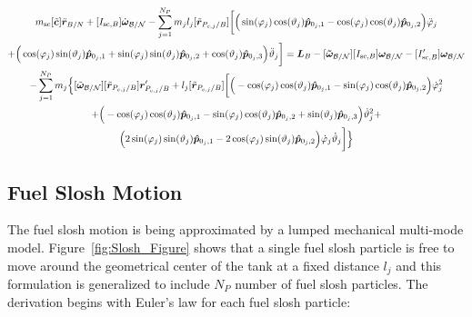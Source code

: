 \documentclass[]{BasiliskReportMemo}
\begin{document}
	\begin{multline}
	m_{\text{sc}}[\tilde{\bm{c}}]\ddot{\bm r}_{B/N}+[I_{\text{sc},B}] \dot{\bm\omega}_{\cal B/N}  - \sum\limits_{j=1}^{N_P}m_j l_j [\tilde{\bm{r}}_{P_{c,j}/B}] \bigg[
	\Big(\sin(\varphi_j)\cos(\vartheta_j)\bm{\hat{p}}_{0_j,1}-\cos(\varphi_j)\cos(\vartheta_j)\bm{\hat{p}}_{0_j,2}\Big)\ddot{\varphi}_j \\
	+\Big(\cos(\varphi_j)\sin(\vartheta_j)\bm{\hat{p}}_{0_j,1}+\sin(\varphi_j)\sin(\vartheta_j)\bm{\hat{p}}_{0_j,2}+\cos(\vartheta_j)\bm{\hat{p}}_{0_j,3} \Big)\ddot{\vartheta}_j
	\bigg] =
	\bm{L}_B-[\bm{\tilde{\omega}}_{\cal B/N}] [I_{\text{sc},B}] \bm\omega_{\cal B/N}
	- [I'_{\text{sc},B}] \bm\omega_{\cal B/N}\\ 	- \sum\limits_{j=1}^{N_P} m_j \Big\{[\tilde{\bm\omega}_{\cal B/N}] [\tilde{\bm{r}}_{P_{c,j}/B}] \bm{r}'_{P_{c,j}/B}+l_j[\tilde{\bm{r}}_{P_{c,j}/B}]\bigg[
	\Big(-\cos(\varphi_j)\cos(\vartheta_j)\bm{\hat{p}}_{0_j,1}-\sin(\varphi_j)\cos(\vartheta_j)\bm{\hat{p}}_{0_j,2}\Big)\dot{\varphi}_j^2 \\
	+\Big(-\cos(\varphi_j)\cos(\vartheta_j)\bm{\hat{p}}_{0_j,1}-\sin(\varphi_j)\cos(\vartheta_j)\bm{\hat{p}}_{0_j,2}+\sin(\vartheta_j)\bm{\hat{p}}_{0_j,3} \Big)\dot{\vartheta}_j^2 +\\
	\Big(2\sin(\varphi_j)\sin(\vartheta_j)\bm{\hat{p}}_{0_j,1} -2\cos(\varphi_j)\sin(\vartheta_j)\bm{\hat{p}}_{0_j,2}\Big)\dot{\varphi}_j\dot{\vartheta}_j
	\bigg]\Big\}
	\label{eq:Final6}
	\end{multline}
	
	\subsection{Fuel Slosh Motion}
	The fuel slosh motion is being approximated by a lumped mechanical multi-mode model. Figure~\ref{fig:Slosh_Figure} shows that a single fuel slosh particle is free to move around the geometrical center of the tank at a fixed distance $l_j$ and this formulation is generalized to include $N_P$ number of fuel slosh particles. The derivation begins with Euler's law for each fuel slosh particle:
	
\end{document}
